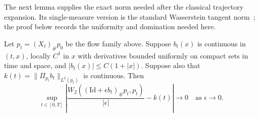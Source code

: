 The next lemma supplies the exact norm needed after the classical
trajectory expansion.  Its single-measure version is the standard
Wasserstein tangent norm~\citep[Chapter~8]{ambrosio2005gradient}; the
proof below records the uniformity and domination needed here.

\begin{lemma}
\label{lem:uniform-global-tangent}
Let $p_t=(X_t)_\#p_0$ be the flow family above.  Suppose $b_t(x)$ is
continuous in $(t,x)$, locally $C^1$ in $x$ with derivatives bounded
uniformly on compact sets in time and space, and
$|b_t(x)|\le C(1+|x|)$.  Suppose also that
$k(t)=\|\Pi_{p_t}b_t\|_{L^2(p_t)}$ is continuous.  Then
\begin{equation}
 \sup_{t\in[0,T]}
 \left|\frac{W_2((\mathrm{Id}+\epsilon b_t)_\#p_t,p_t)}{|\epsilon|}
       -k(t)\right|\longrightarrow0
 \quad\text{as }\epsilon\to0.
 \label{eq:uniform-tangent-expansion}
\end{equation}
\end{lemma}

